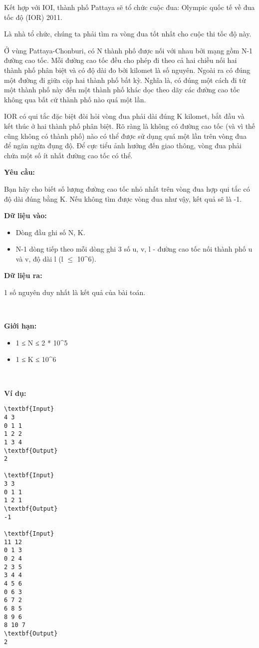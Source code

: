 

Kết hợp với IOI, thành phố Pattaya sẽ tổ chức cuộc đua: Olympic quốc tế về đua tốc độ (IOR) 2011.

Là nhà tổ chức, chúng ta phải tìm ra vòng đua tốt nhất cho cuộc thi tốc độ này.

Ở vùng Pattaya-Chonburi, có N thành phố được nối với nhau bởi mạng gồm N-1 đường cao tốc. Mỗi đường cao tốc đều cho phép đi theo cả hai chiều nối hai thành phố phân biệt và có độ dài đo bởi kilomet là số nguyên. Ngoài ra có đúng một đường đi giữa cặp hai thành phố bất kỳ. Nghĩa là, có đúng một cách đi từ một thành phố này đến một thành phố khác dọc theo dãy các đường cao tốc không qua bất cứ thành phố nào quá một lần.

IOR có qui tắc đặc biệt đòi hỏi vòng đua phải dài đúng K kilomet, bắt đầu và kết thúc ở hai thành phố phân biệt. Rõ ràng là không có đường cao tốc (và vì thế cũng không có thành phố) nào có thể được sử dụng quá một lần trên vòng đua để ngăn ngừa đụng độ. Để cực tiểu ảnh hưởng đến giao thông, vòng đua phải chứa một số ít nhất đường cao tốc có thể.

\textbf{Yêu cầu: }

Bạn hãy cho biết số lượng đường cao tốc nhỏ nhất trên vòng đua hợp qui tắc có độ dài đúng bằng K. Nếu không tìm được vòng đua như vậy, kết quả sẽ là -1.

\textbf{Dữ liệu vào: }
\begin{itemize}
	\item Dòng đầu ghi số N, K.
	\item N-1 dòng tiếp theo mỗi dòng ghi 3 số u, v, l - đường cao tốc nối thành phố u và v, độ dài l (l  $\le$  10\textasciicircum6).
\end{itemize}

\textbf{Dữ liệu ra: }

1 số nguyên duy nhất là kết quả của bài toán.

 

\textbf{Giới hạn: }
\begin{itemize}
	\item 1 ≤ N ≤ 2 * 10\textasciicircum5
	\item 1 ≤ K ≤ 10\textasciicircum6
\end{itemize}

 

\textbf{Ví dụ: }
\begin{verbatim}
\textbf{Input}
4 3
0 1 1
1 2 2
1 3 4
\textbf{Output}
2

\textbf{Input}
3 3
0 1 1
1 2 1
\textbf{Output}
-1

\textbf{Input}
11 12
0 1 3
0 2 4
2 3 5
3 4 4
4 5 6
0 6 3
6 7 2
6 8 5
8 9 6
8 10 7
\textbf{Output}
2\end{verbatim}

 

